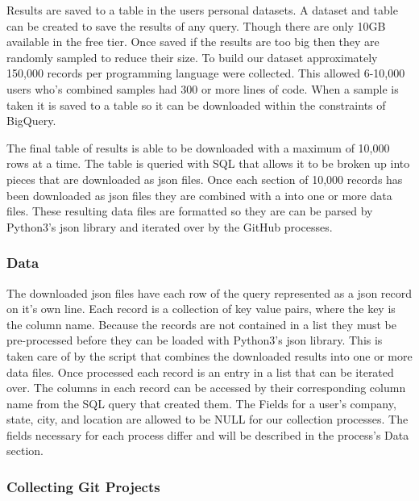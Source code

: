 \documentclass[12pt]{article}
\begin{document}
Results are saved to a table in the users personal datasets. A dataset and table can be created to save the results of any query. Though there are only 10GB available in the free tier. Once saved if the results are too big then they are randomly sampled to reduce their size. To build our dataset approximately 150,000 records per programming language were collected. This allowed 6-10,000 users who's combined samples had 300 or more lines of code. When a sample is taken it is saved to a table so it can be downloaded within the constraints of BigQuery.

The final table of results is able to be downloaded with a maximum of 10,000 rows at a time. The table is queried with SQL that allows it to be broken up into pieces that are downloaded as json files. Once each section of 10,000 records has been downloaded as json files they are combined with a into one or more data files. These resulting data files are formatted so they are can be parsed by Python3's json library and iterated over by the GitHub processes.

\subsubsection*{Data}
The downloaded json files have each row of the query represented as a json record on it's own line. Each record is a collection of key value pairs, where the key is the column name. Because the records are not contained in a list they must be pre-processed before they can be loaded with Python3's json library. This is taken care of by the script that combines the downloaded results into one or more data files. Once processed each record is an entry in a list that can be iterated over. The columns in each record can be accessed by their corresponding column name from the SQL query that created them. The Fields for a user's company, state, city, and location are allowed to be NULL for our collection processes. The fields necessary for each process differ and will be described in the process's Data section.

\subsubsection{Collecting Git Projects}
\end{document}
